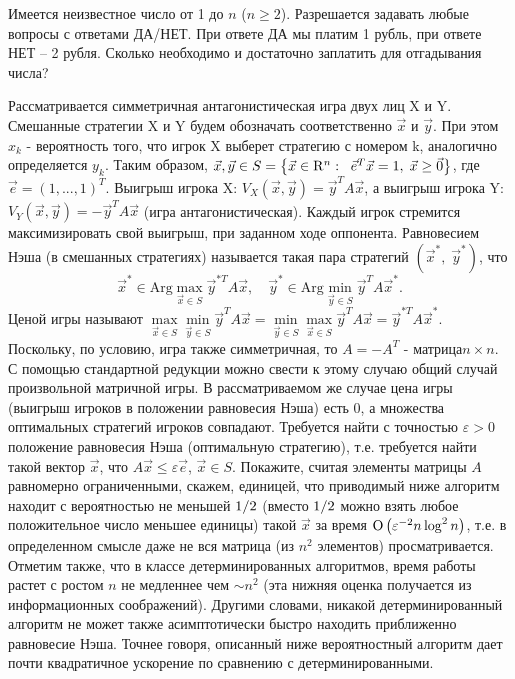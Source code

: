  \begin{problem} 
Имеется неизвестное число от 1 до $n$ ($n\ge 2$). Разрешается задавать любые вопросы с ответами ДА/НЕТ. При ответе ДА мы платим 1 рубль, при ответе НЕТ -- 2 рубля. Сколько необходимо и достаточно заплатить для отгадывания числа?
\end{problem}


\begin{problem}
Рассматривается симметричная 
антагонистическая игра двух лиц X и Y. Смешанные стратегии X и Y будем 
обозначать соответственно $\vec {x}$ и $\vec {y}$. При этом $x_k $ - 
вероятность того, что игрок X выберет стратегию с номером k, аналогично 
определяется $y_k $. Таким образом, $\vec {x},\vec {y}\in S=\left\{ {\vec 
{x}\in {\rm R}^n:\;\;\vec {e}^T\vec {x}=1,\;\vec {x}\ge \vec {0}} \right\}$, 
где $\vec {e}=\left( {1,...,1} \right)^T$. Выигрыш игрока X: $V_X \left( 
{\vec {x},\vec {y}} \right)=\vec {y}^TA\vec {x}$, а выигрыш игрока Y: $V_Y 
\left( {\vec {x},\vec {y}} \right)=-\vec {y}^TA\vec {x}$ (игра 
антагонистическая). Каждый игрок стремится максимизировать свой выигрыш, при 
заданном ходе оппонента. Равновесием Нэша (в смешанных стратегиях) 
называется такая пара стратегий $\left( {\vec {x}^\ast ,\;\vec {y}^\ast } 
\right)$, что
\[
\vec {x}^\ast \in \mbox{Arg}\mathop {\max }\limits_{\vec {x}\in S} \vec 
{y}^{\ast T} A\vec {x},
\quad
\vec {y}^\ast \in \mbox{Arg}\mathop {\min }\limits_{\vec {y}\in S} \vec 
{y}^TA\vec {x}^\ast .
\]
Ценой игры называют $\mathop {\max }\limits_{\vec {x}\in S} \mathop {\min 
}\limits_{\vec {y}\in S} \vec {y}^TA\vec {x}=\mathop {\min }\limits_{\vec 
{y}\in S} \mathop {\max }\limits_{\vec {x}\in S} \vec {y}^TA\vec {x}=\vec 
{y}^{\ast T}A\vec {x}^\ast $. Поскольку, по условию, игра также симметричная, 
то $A=-A^T$ - матрица$n\times n$. С помощью стандартной редукции можно 
свести к этому случаю общий случай произвольной матричной игры. В 
рассматриваемом же случае цена игры (выигрыш игроков в положении равновесия 
Нэша) есть 0, а множества оптимальных стратегий игроков совпадают. Требуется 
найти с точностью $\varepsilon >0$ положение равновесия Нэша (оптимальную 
стратегию), т.е. требуется найти такой вектор $\vec {x}$, что $A\vec {x}\le 
\varepsilon \vec {e}$, $\vec {x}\in S$. Покажите, считая элементы матрицы 
$A$ равномерно ограниченными, скажем, единицей, что приводимый ниже алгоритм 
находит с вероятностью не меньшей $1 \mathord{\left/ {\vphantom {1 2}} 
\right. \kern-\nulldelimiterspace} 2$ (вместо $1 \mathord{\left/ {\vphantom 
{1 2}} \right. \kern-\nulldelimiterspace} 2$ можно взять любое положительное 
число меньшее единицы) такой $\vec {x}$ за время ${\rm O}\left( {\varepsilon 
^{-2}n\log ^2n} \right)$, т.е. в определенном смысле даже не вся матрица (из 
$n^2$ элементов) просматривается. Отметим также, что в классе 
детерминированных алгоритмов, время работы растет с ростом $n$ не медленнее 
чем $\sim n^2$ (эта нижняя оценка получается из информационных соображений). 
Другими словами, никакой детерминированный алгоритм не может также 
асимптотически быстро находить приближенно равновесие Нэша. Точнее говоря, 
описанный ниже вероятностный алгоритм дает почти квадратичное ускорение по 
сравнению с детерминированными.


\end{problem}

